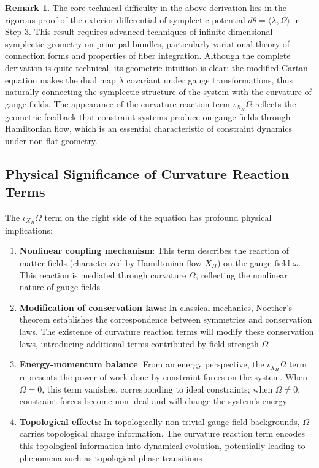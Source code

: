 \documentclass[a4paper,12pt]{extarticle}
\theoremstyle{definition}
\newtheorem{remark}{Remark}
\begin{document}
\begin{remark}
The core technical difficulty in the above derivation lies in the rigorous proof of the exterior differential of symplectic potential $d\theta = \langle\lambda, \Omega\rangle$ in Step 3. This result requires advanced techniques of infinite-dimensional symplectic geometry on principal bundles, particularly variational theory of connection forms and properties of fiber integration. Although the complete derivation is quite technical, its geometric intuition is clear: the modified Cartan equation makes the dual map $\lambda$ covariant under gauge transformations, thus naturally connecting the symplectic structure of the system with the curvature of gauge fields. The appearance of the curvature reaction term $\iota_{X_H}\Omega$ reflects the geometric feedback that constraint systems produce on gauge fields through Hamiltonian flow, which is an essential characteristic of constraint dynamics under non-flat geometry.
\end{remark}

\subsection{Physical Significance of Curvature Reaction Terms}

The $\iota_{X_H} \Omega$ term on the right side of the equation has profound physical implications:

\begin{enumerate}
\item \textbf{Nonlinear coupling mechanism}: This term describes the reaction of matter fields (characterized by Hamiltonian flow $X_H$) on the gauge field $\omega$. This reaction is mediated through curvature $\Omega$, reflecting the nonlinear nature of gauge fields

\item \textbf{Modification of conservation laws}: In classical mechanics, Noether's theorem establishes the correspondence between symmetries and conservation laws. The existence of curvature reaction terms will modify these conservation laws, introducing additional terms contributed by field strength $\Omega$

\item \textbf{Energy-momentum balance}: From an energy perspective, the $\iota_{X_H} \Omega$ term represents the power of work done by constraint forces on the system. When $\Omega = 0$, this term vanishes, corresponding to ideal constraints; when $\Omega \neq 0$, constraint forces become non-ideal and will change the system's energy

\item \textbf{Topological effects}: In topologically non-trivial gauge field backgrounds, $\Omega$ carries topological charge information. The curvature reaction term encodes this topological information into dynamical evolution, potentially leading to phenomena such as topological phase transitions
\end{enumerate}
\end{document}
